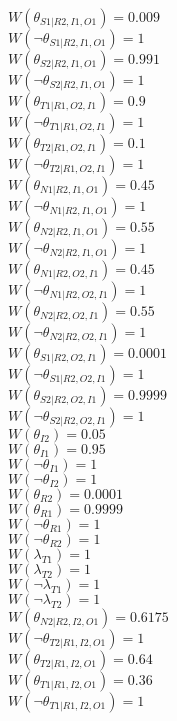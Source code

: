 $W(\theta_{S1|R2,I1,O1})=0.009$\\
$W(\neg\theta_{S1|R2,I1,O1})=1$\\
$W(\theta_{S2|R2,I1,O1})=0.991$\\
$W(\neg\theta_{S2|R2,I1,O1})=1$\\
$W(\theta_{T1|R1,O2,I1})=0.9$\\
$W(\neg\theta_{T1|R1,O2,I1})=1$\\
$W(\theta_{T2|R1,O2,I1})=0.1$\\
$W(\neg\theta_{T2|R1,O2,I1})=1$\\
$W(\theta_{N1|R2,I1,O1})=0.45$\\
$W(\neg\theta_{N1|R2,I1,O1})=1$\\
$W(\theta_{N2|R2,I1,O1})=0.55$\\
$W(\neg\theta_{N2|R2,I1,O1})=1$\\
$W(\theta_{N1|R2,O2,I1})=0.45$\\
$W(\neg\theta_{N1|R2,O2,I1})=1$\\
$W(\theta_{N2|R2,O2,I1})=0.55$\\
$W(\neg\theta_{N2|R2,O2,I1})=1$\\
$W(\theta_{S1|R2,O2,I1})=0.0001$\\
$W(\neg\theta_{S1|R2,O2,I1})=1$\\
$W(\theta_{S2|R2,O2,I1})=0.9999$\\
$W(\neg\theta_{S2|R2,O2,I1})=1$\\
$W(\theta_{I2})=0.05$\\
$W(\theta_{I1})=0.95$\\
$W(\neg\theta_{I1})=1$\\
$W(\neg\theta_{I2})=1$\\
$W(\theta_{R2})=0.0001$\\
$W(\theta_{R1})=0.9999$\\
$W(\neg\theta_{R1})=1$\\
$W(\neg\theta_{R2})=1$\\
$W(\lambda_{T1})=1$\\
$W(\lambda_{T2})=1$\\
$W(\neg\lambda_{T1})=1$\\
$W(\neg\lambda_{T2})=1$\\
$W(\theta_{N2|R2,I2,O1})=0.6175$\\
$W(\neg\theta_{T2|R1,I2,O1})=1$\\
$W(\theta_{T2|R1,I2,O1})=0.64$\\
$W(\theta_{T1|R1,I2,O1})=0.36$\\
$W(\neg\theta_{T1|R1,I2,O1})=1$\\
